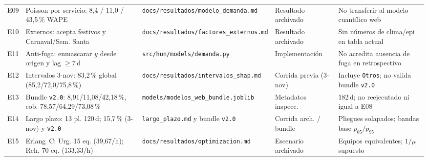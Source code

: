 \begin{table}[t]
\begin{tabularx}{\textwidth}{@{}L{0.04\textwidth} L{0.27\textwidth} L{0.24\textwidth} L{0.15\textwidth} Y@{}}
E09 & Poisson por servicio: 8,4 / 11,0 / 43,5\,\% WAPE & \nolinkurl{docs/resultados/modelo_demanda.md} & Resultado archivado & No transferir al modelo cuantílico web \\
E10 & Externos: acepta festivos y Carnaval/Sem. Santa & \nolinkurl{docs/resultados/factores_externos.md} & Resultado archivado & Sin números de clima/epi en tabla actual \\
E11 & Anti-fuga: enmascarar $y$ desde origen y lag $\ge 7$\,d & \nolinkurl{src/hun/models/demanda.py} & Implementación & No acredita ausencia de fuga en retrospectivo \\
E12 & Intervalos 3-nov: 83,2\,\% global (85,2/72,0/75,8\,\%) & \nolinkurl{docs/resultados/intervalos_shap.md} & Corrida previa (3-nov) & Incluye \texttt{Otros}; no valida bundle \texttt{v2.0} \\
E13 & Bundle \texttt{v2.0}: 8,91/11,08/42,18\,\%, cob. 78,57/64,29/73,08\,\% & \nolinkurl{models/modelos_web_bundle.joblib} & Metadatos inspecc. & 182\,d; no reejecutado ni igual a E08 \\
E14 & Largo plazo: 13 pl. 120\,d; 15,7\,\% (3-nov) y \texttt{v2.0} & \nolinkurl{largo_plazo.md} y bundle \texttt{v2.0} & Corrida arch. / bundle & Pliegues solapados; bandas base $p_{05}/p_{95}$ \\
E15 & Erlang~C: Urg. 15 eq. (39,67/h); Reh. 70 eq. (133,33/h) & \nolinkurl{docs/resultados/optimizacion.md} & Escenario archivado & Equipos equivalentes; $1/\mu$ supuesto \\
\bottomrule
\end{tabularx}
\end{table}


